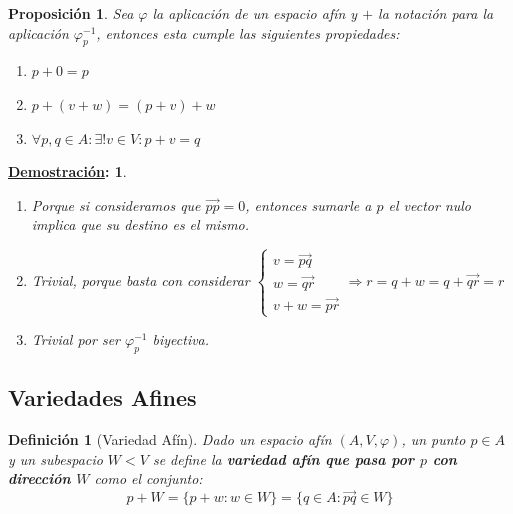 \documentclass[10pt,a4paper,openright]{book}
\theoremstyle{break}
\newtheorem*{defi}{Definición}
\newtheorem*{prop}{Proposición}
\newtheorem*{demo}{\underline{Demostración}:}
\begin{document}
\begin{prop}
Sea $\varphi$ la aplicación de un espacio afín y $+$ la notación para la aplicación $\varphi_p^{-1}$, entonces esta cumple las siguientes propiedades:
\begin{enumerate}
\item $p + 0 = p$
\item $p + (v+ w) = (p + v)+ w$
\item $\forall p,q \in A: \exists! v \in V : p + v = q$
\end{enumerate}
\end{prop}
\begin{demo}
\begin{enumerate}
\item Porque si consideramos que $\vec{pp}= 0$, entonces sumarle a $p$ el vector nulo implica que su destino es el mismo.

\item Trivial, porque basta con considerar $\begin{cases} v = \vec{pq} \\ w = \vec{qr} \\ v + w = \vec{pr} \end{cases} \Rightarrow r = q + w = q + \vec{qr} = r$

\item Trivial por ser $\varphi_p^{-1}$ biyectiva.
\end{enumerate}
\end{demo}

\subsection{Variedades Afines}
\begin{defi}[Variedad Afín]
Dado un espacio afín $(A,V,\varphi)$, un punto $p \in A$ y un subespacio $W < V$ se define la \textbf{variedad afín que pasa por $p$ con dirección $W$} como el conjunto:
$$p + W = \{p + w : w \in W\} = \{q\in A : \vec{pq}\in W\}$$
\end{defi}
\end{document}
